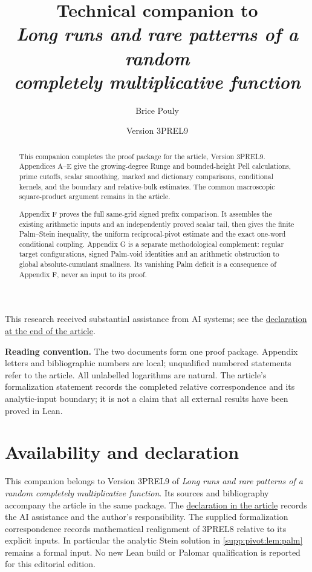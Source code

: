 \documentclass[11pt,a4paper]{article}
\title{\textbf{Technical companion to}\\[2mm]
\large\emph{Long runs and rare patterns of a random\\completely multiplicative function}}
\author{Brice Pouly}
\date{Version 3PREL9}
\begin{document}
\maketitle
\vspace{-0.6em}
\noindent\begin{minipage}{\textwidth}\footnotesize
This research received substantial assistance from AI systems; see the
\hyperref[sec:ai-assistance]{declaration at the end of the article}.
\end{minipage}\medskip
\begin{abstract}
This companion completes the proof package for the article, Version 3PREL9.
Appendices A--E give the growing-degree Runge and bounded-height Pell
calculations, prime cutoffs, scalar smoothing, marked and dictionary
comparisons, conditional kernels, and the boundary and relative-bulk
estimates. The common macroscopic square-product argument remains in
the article.

Appendix F proves the full same-grid signed prefix comparison. It
assembles the existing arithmetic inputs and an independently proved
scalar tail, then gives the finite Palm--Stein inequality, the uniform
reciprocal-pivot estimate and the exact one-word conditional coupling.
Appendix G is a separate methodological complement: regular target
configurations, signed Palm-void identities and an arithmetic obstruction
to global absolute-cumulant smallness. Its vanishing Palm deficit is a
consequence of Appendix F, never an input to its proof.
\end{abstract}
\medskip
\noindent\textbf{Reading convention.} The two documents form one proof package.
Appendix letters and bibliographic numbers are local; unqualified
numbered statements refer to the article. All unlabelled logarithms are
natural. The article's formalization statement records the completed
relative correspondence and its analytic-input boundary; it is not a
claim that all external results have been proved in Lean.

\tableofcontents
\clearpage


\medskip
\appendix







\section*{Availability and declaration}
This companion belongs to Version 3PREL9 of \emph{Long runs and rare
patterns of a random completely multiplicative function}. Its sources
and bibliography accompany the article in the same package. The
\hyperref[sec:ai-assistance]{declaration in the article} records the AI
assistance and the author's responsibility. The supplied formalization
correspondence records mathematical realignment of 3PREL8 relative to its
explicit inputs. In particular the analytic Stein solution in
\cref{supp:pivot:lem:palm} remains a formal input. No new Lean build or
Palomar qualification is reported for this editorial edition.
\printbibliography[heading=bibintoc,title={References}]
\end{document}
